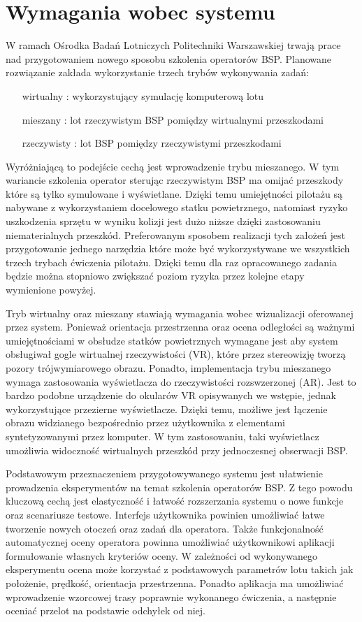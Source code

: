 \newpage
\section{Wymagania wobec systemu}
W ramach Ośrodka Badań Lotniczych Politechniki Warszawskiej trwają prace nad przygotowaniem nowego sposobu szkolenia operatorów BSP. Planowane rozwiązanie zakłada wykorzystanie trzech trybów wykonywania zadań:
\begin{enumerate}
  \item[wirtualny]: wykorzystujący symulację komputerową lotu
  \item[mieszany]: lot rzeczywistym BSP pomiędzy wirtualnymi przeszkodami
  \item[rzeczywisty]: lot BSP pomiędzy rzeczywistymi przeszkodami
\end{enumerate}
Wyróżniającą to podejście cechą jest wprowadzenie trybu mieszanego. W tym wariancie szkolenia operator sterując rzeczywistym BSP ma omijać przeszkody które są tylko symulowane i wyświetlane. Dzięki temu umiejętności pilotażu są nabywane z wykorzystaniem docelowego statku powietrznego, natomiast ryzyko uszkodzenia sprzętu w wyniku kolizji jest dużo niższe dzięki zastosowaniu niematerialnych przeszkód. Preferowanym sposobem realizacji tych założeń jest przygotowanie jednego narzędzia które może być wykorzystywane we wszystkich trzech trybach ćwiczenia pilotażu. Dzięki temu dla raz opracowanego zadania będzie można stopniowo zwiększać poziom ryzyka przez kolejne etapy wymienione powyżej.

Tryb wirtualny oraz mieszany stawiają wymagania wobec wizualizacji oferowanej przez system. Ponieważ orientacja przestrzenna oraz ocena odległości są ważnymi umiejętnościami w obsłudze statków powietrznych wymagane jest aby system obsługiwał gogle wirtualnej rzeczywistości (VR), które przez stereowizję tworzą pozory trójwymiarowego obrazu. Ponadto, implementacja trybu mieszanego wymaga zastosowania wyświetlacza do rzeczywistości rozswzerzonej (AR). Jest to bardzo podobne urządzenie do okularów VR opisywanych we wstępie, jednak wykorzystujące przezierne wyświetlacze. Dzięki temu, możliwe jest łączenie obrazu widzianego bezpośrednio przez użytkownika z elementami syntetyzowanymi przez komputer. W tym zastosowaniu, taki wyświetlacz umożliwia widoczność wirtualnych przeszkód przy jednoczesnej obserwacji BSP.

Podstawowym przeznaczeniem przygotowywanego systemu jest ułatwienie prowadzenia eksperymentów na temat szkolenia operatorów BSP. Z tego powodu kluczową cechą jest elastyczność i łatwość rozszerzania systemu o nowe funkcje oraz scenariusze testowe. Interfejs użytkownika powinien umożliwiać łatwe tworzenie nowych otoczeń oraz zadań dla operatora. Także funkcjonalność automatycznej oceny operatora powinna umożliwiać użytkownikowi aplikacji formułowanie własnych kryteriów oceny. W zależności od wykonywanego eksperymentu ocena może korzystać z podstawowych parametrów lotu takich jak położenie, prędkość, orientacja przestrzenna. Ponadto aplikacja ma umożliwiać wprowadzenie wzorcowej trasy poprawnie wykonanego ćwiczenia, a następnie oceniać przelot na podstawie odchyłek od niej.

